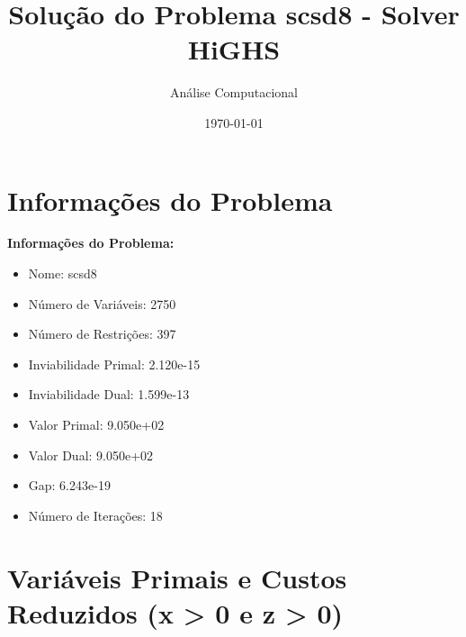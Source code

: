 \documentclass[12pt]{article}
\title{Solução do Problema scsd8 - Solver HiGHS}
\author{Análise Computacional}
\date{\today}
\begin{document}
\maketitle

\section{Informações do Problema}

\textbf{Informações do Problema:}
\begin{itemize}
\item Nome: scsd8
\item Número de Variáveis: 2750
\item Número de Restrições: 397
\item Inviabilidade Primal: 2.120e-15
\item Inviabilidade Dual: 1.599e-13
\item Valor Primal: 9.050e+02
\item Valor Dual: 9.050e+02
\item Gap: 6.243e-19
\item Número de Iterações: 18
\end{itemize}


\section{Variáveis Primais e Custos Reduzidos (x > 0 e z > 0)}
\end{document}
